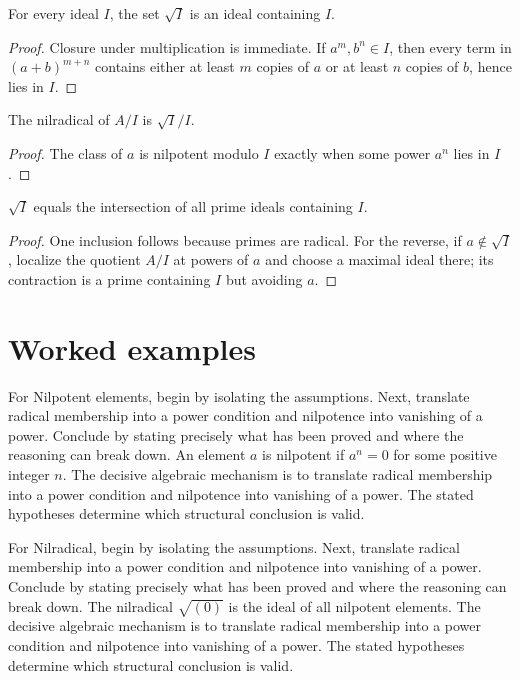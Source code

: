 \begin{theorem}\label{thm:v03-01}
For every ideal $I$, the set $\sqrt I$ is an ideal containing $I$.
\begin{proof}
Closure under multiplication is immediate. If $a^m,b^n\in I$, then every term in $(a+b)^{m+n}$ contains either at least $m$ copies of $a$ or at least $n$ copies of $b$, hence lies in $I$.
\end{proof}
\end{theorem}

\begin{theorem}\label{thm:v03-02}
The nilradical of $A/I$ is $\sqrt I/I$.
\begin{proof}
The class of $a$ is nilpotent modulo $I$ exactly when some power $a^n$ lies in $I$.
\end{proof}
\end{theorem}

\begin{theorem}\label{thm:v03-03}
$\sqrt I$ equals the intersection of all prime ideals containing $I$.
\begin{proof}
One inclusion follows because primes are radical. For the reverse, if $a\notin\sqrt I$, localize the quotient $A/I$ at powers of $a$ and choose a maximal ideal there; its contraction is a prime containing $I$ but avoiding $a$.
\end{proof}
\end{theorem}

\section{Worked examples}

\begin{example}\label{ex:v03-worked-01}
For Nilpotent elements, begin by isolating the assumptions. Next, translate radical membership into a power condition and nilpotence into vanishing of a power. Conclude by stating precisely what has been proved and where the reasoning can break down. An element $a$ is nilpotent if $a^n=0$ for some positive integer $n$. The decisive algebraic mechanism is to translate radical membership into a power condition and nilpotence into vanishing of a power. The stated hypotheses determine which structural conclusion is valid.
\end{example}

\begin{example}\label{ex:v03-worked-02}
For Nilradical, begin by isolating the assumptions. Next, translate radical membership into a power condition and nilpotence into vanishing of a power. Conclude by stating precisely what has been proved and where the reasoning can break down. The nilradical $\sqrt{(0)}$ is the ideal of all nilpotent elements. The decisive algebraic mechanism is to translate radical membership into a power condition and nilpotence into vanishing of a power. The stated hypotheses determine which structural conclusion is valid.
\end{example}


